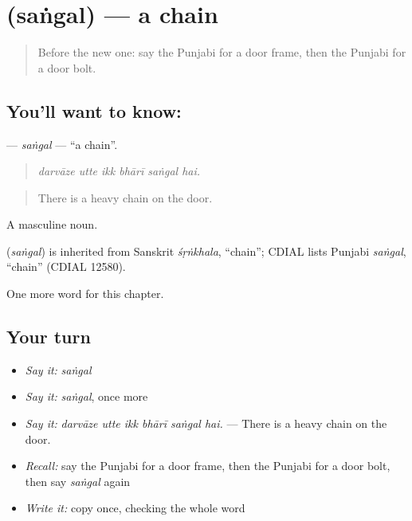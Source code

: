 \section[\texorpdfstring{\pa{ਸੰਗਲ} (saṅgal)}{ਸੰਗਲ (saṅgal)}]{ (saṅgal) — a chain}

\label{lesson:PA-C248-sangal}



\begin{quote}
Before the new one: say the Punjabi for a door frame, then the Punjabi for a door bolt.
\end{quote}

\subsection*{You'll want to know: }
\textbf{} — \emph{saṅgal} — \textquotedblleft{}a chain\textquotedblright{}.

\begin{quote}
     
\end{quote}

\begin{quote}
\emph{darvāze utte ikk bhārī saṅgal hai.}
\end{quote}

\begin{quote}
There is a heavy chain on the door.
\end{quote}

A masculine noun.

\begin{cousinweb}
\textbf{} (\emph{saṅgal}) is inherited from Sanskrit \emph{śṛṅkhala}, \textquotedblleft{}chain\textquotedblright{}; CDIAL lists Punjabi \emph{saṅgal}, \textquotedblleft{}chain\textquotedblright{} (CDIAL 12580).
\end{cousinweb}

\begin{grammarlens}[title={What you've built}]
One more word for this chapter.
\end{grammarlens}

\subsection*{Your turn}
\begin{itemize}
\raggedright
  \item \emph{Say it:} \emph{saṅgal}
  \item \emph{Say it:} \emph{saṅgal}, once more
  \item \emph{Say it:} \emph{darvāze utte ikk bhārī saṅgal hai.} — There is a heavy chain on the door.
  \item \emph{Recall:} say the Punjabi for a door frame, then the Punjabi for a door bolt, then say \emph{saṅgal} again
  \item \emph{Write it:} copy \textbf{} once, checking the whole word
\end{itemize}

